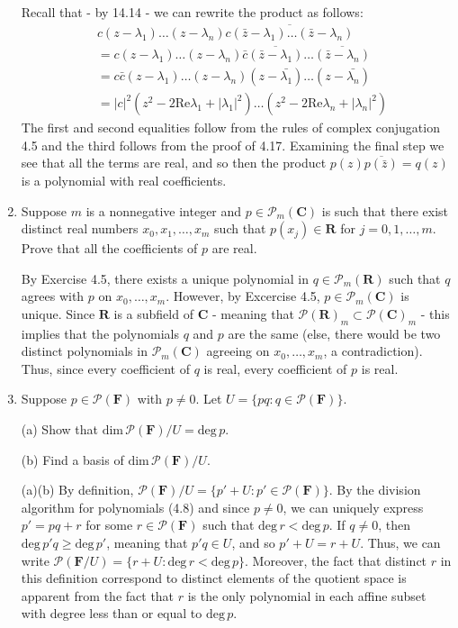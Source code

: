 \documentclass{book}
\begin{document}
\begin{enumerate}
Recall that - by 14.14 - we can rewrite the product as follows:
\begin{align*}
&c(z-\lambda_1)\dots(z-\lambda_n)\overline{c(\bar{z}-\lambda_1)\dots(\bar{z}-\lambda_n)} \\
&=c(z-\lambda_1)\dots(z-\lambda_n)\bar{c}\overline{(\bar{z}-\lambda_1)}\dots\overline{(\bar{z}-\lambda_n)} \\
&=c\bar{c}(z-\lambda_1)\dots(z-\lambda_n)(z-\bar{\lambda_1})\dots(z-\bar{\lambda_n}) \\
&=|c|^2(z^2-2\textrm{Re}\lambda_1+|\lambda_1|^2)\dots(z^2-2\textrm{Re}\lambda_n+|\lambda_n|^2)
\end{align*}
The first and second equalities follow from the rules of complex conjugation 4.5 and the third follows from the proof of 4.17.  Examining the final step we see that all the terms are real, and so then the product \(p(z)\overline{p(\bar{z})}=q(z)\) is a polynomial with real coefficients.

\item Suppose \(m\) is a nonnegative integer and \(p \in \mathcal{P}_m(\textbf{C})\) is such that there exist distinct real numbers \(x_0,x_1,\dots,x_m\) such that \(p(x_j) \in \textbf{R}\) for \(j=0,1,\dots,m\).  Prove that all the coefficients of \(p\) are real.

By Exercise 4.5, there exists a unique polynomial in \(q \in \mathcal{P}_m(\textbf{R})\) such that \(q\) agrees with \(p\) on \(x_0,\dots,x_m\).  However, by Excercise 4.5, \(p \in \mathcal{P}_m(\textbf{C})\) is unique.  Since \(\textbf{R}\) is a subfield of \(\textbf{C}\) - meaning that \(\mathcal{P}(\textbf{R})_m \subset \mathcal{P}(\textbf{C})_m\) - this implies that the polynomials \(q\) and \(p\) are the same (else, there would be two distinct polynomials in \(\mathcal{P}_m(\textbf{C})\) agreeing on \(x_0,\dots,x_m\), a contradiction).  Thus, since every coefficient of \(q\) is real, every coefficient of \(p\) is real.

\item Suppose \(p \in \mathcal{P}(\textbf{F})\) with \(p \neq 0\).  Let \(U=\{pq: q \in \mathcal{P}(\textbf{F})\}\).

(a) Show that \(\textrm{dim} \, \mathcal{P}(\textbf{F})/U = \textrm{deg} \, p\).

(b) Find a basis of \(\textrm{dim} \, \mathcal{P}(\textbf{F})/U\).

(a)(b) By definition, \(\mathcal{P}(\textbf{F})/U=\{p' + U:p' \in \mathcal{P}(\textbf{F})\}\).  By the division algorithm for polynomials (4.8) and since \(p \neq 0\), we can uniquely express \(p'=pq+r\) for some \(r \in \mathcal{P}(\textbf{F})\) such that \(\text{deg} \, r < \text{deg} \, p\).  If \(q \neq 0\), then \(\text{deg} \, p'q \geq \text{deg} \, p'\), meaning that \(p'q \in U\), and so \(p'+U=r+U\).  Thus, we can write \(\mathcal{P}(\textbf{F}/U) = \{r+U:\text{deg} \, r < \text{deg} \, p\}\).  Moreover, the fact that distinct \(r\) in this definition correspond to distinct elements of the quotient space is apparent from the fact that \(r\) is the only polynomial in each affine subset with degree less than or equal to \(\text{deg} \, p\).


\end{enumerate}
\end{document}
